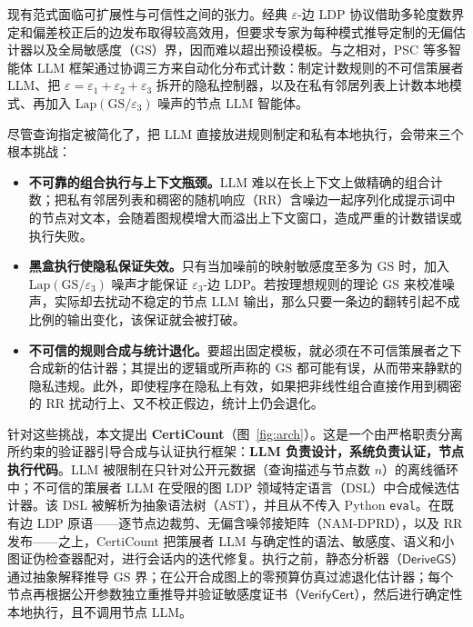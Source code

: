 \documentclass[11pt]{article}
\theoremstyle{ieeeitalic}
\newcommand{\GS}{\mathrm{GS}}
\newcommand{\Lap}{\mathrm{Lap}}
\newcommand{\DeriveGS}{\mathsf{DeriveGS}}
\newcommand{\VerifyCert}{\mathsf{VerifyCert}}
\begin{document}
现有范式面临可扩展性与可信性之间的张力。经典 $\varepsilon$-边 LDP 协议\cite{imola2021locally,imola2022communication,he2025robust,guo2025nam}借助多轮度数界定和偏差校正后的边发布取得较高效用，但要求专家为每种模式推导定制的无偏估计器以及全局敏感度（$\GS$）界，因而难以超出预设模板。与之相对，PSC 等多智能体 LLM 框架\cite{zhang2026psc}通过协调三方来自动化分布式计数：制定计数规则的不可信策展者 LLM、把 $\varepsilon = \varepsilon_1 + \varepsilon_2 + \varepsilon_3$ 拆开的隐私控制器，以及在私有邻居列表上计数本地模式、再加入 $\Lap(\GS/\varepsilon_3)$ 噪声的节点 LLM 智能体。

尽管查询指定被简化了，把 LLM 直接放进规则制定和私有本地执行，会带来三个根本挑战：
\begin{itemize}
    \item \textbf{不可靠的组合执行与上下文瓶颈。}LLM 难以在长上下文上做精确的组合计数\cite{liu2023lost}；把私有邻居列表和稠密的随机响应（RR）含噪边一起序列化成提示词中的节点对文本，会随着图规模增大而溢出上下文窗口\cite{zhang2026psc}，造成严重的计数错误或执行失败。
    \item \textbf{黑盒执行使隐私保证失效。}只有当加噪前的映射敏感度至多为 $\GS$ 时，加入 $\Lap(\GS/\varepsilon_3)$ 噪声才能保证 $\varepsilon_3$-边 LDP\cite{dwork2014algorithmic}。若按理想规则的理论 $\GS$ 来校准噪声，实际却去扰动不稳定的节点 LLM 输出，那么只要一条边的翻转引起不成比例的输出变化，该保证就会被打破。
    \item \textbf{不可信的规则合成与统计退化。}要超出固定模板，就必须在不可信策展者之下合成新的估计器；其提出的逻辑或所声称的 $\GS$ 都可能有误，从而带来静默的隐私违规。此外，即使程序在隐私上有效，如果把非线性组合直接作用到稠密的 RR 扰动行上、又不校正假边，统计上仍会退化。
\end{itemize}

针对这些挑战，本文提出 \textbf{CertiCount}（图~\ref{fig:arch}）。这是一个由严格职责分离所约束的验证器引导合成与认证执行框架：\textbf{LLM 负责设计，系统负责认证，节点执行代码}。LLM 被限制在只针对公开元数据（查询描述与节点数 $n$）的离线循环中；不可信的策展者 LLM 在受限的图 LDP 领域特定语言（DSL）中合成候选估计器。该 DSL 被解析为抽象语法树（AST），并且从不传入 Python \texttt{eval}。在既有边 LDP 原语——逐节点边裁剪\cite{imola2022communication}、无偏含噪邻接矩阵（NAM-DPRD）\cite{guo2025nam}，以及 RR 发布——之上，CertiCount 把策展者 LLM 与确定性的语法、敏感度、语义和小图证伪检查器配对，进行会话内的迭代修复。执行之前，静态分析器（$\DeriveGS$）通过抽象解释推导 $\GS$ 界；在公开合成图上的零预算仿真\cite{holme2002growing,chung2002connected}过滤退化估计器；每个节点再根据公开参数独立重推导并验证敏感度证书（$\VerifyCert$），然后进行确定性本地执行，且不调用节点 LLM。
\end{document}
